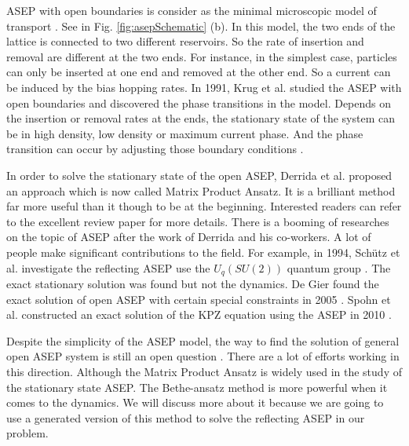 ASEP with open boundaries is consider as the minimal microscopic model of transport \cite{Crampe2014b, Mallick2011b}. See in Fig. \ref{fig:asepSchematic} (b). In this model, the two ends of the lattice is connected to two different reservoirs. So the rate of insertion and removal are different at the two ends. For instance, in the simplest case, particles can only be inserted at one end and removed at the other end. So a current can be induced by the bias hopping rates. In 1991, Krug et al. studied the ASEP with open boundaries and discovered the phase transitions in the model. Depends on the insertion or removal rates at the ends, the stationary state of the system can be in high density, low density or maximum current phase. And the phase transition can occur by adjusting those boundary conditions \cite{Krug1991}. 

In order to solve the stationary state of the open ASEP, Derrida et al. proposed an approach which is now called Matrix Product Ansatz. It is a brilliant method far more useful than it though to be at the beginning. Interested readers can refer to the excellent review paper for more details. There is a booming of researches on the topic of ASEP after the work of Derrida and his co-workers. A lot of people make significant contributions to the field. For example, in 1994, Sch\"{u}tz et al. investigate the reflecting ASEP use the $U_q(SU(2))$ quantum group \cite{Sandow1994}. The exact stationary solution was found but not the dynamics. De Gier found the exact solution of open ASEP with certain special constraints in 2005 \cite{DeGier2005}. Spohn et al. constructed an exact solution of the KPZ equation using the ASEP in 2010 \cite{Sasamoto2010}. 

Despite the simplicity of the ASEP model, the way to find the solution of general open ASEP system is still an open question \cite{Crampe2014b, Mallick2011b}. There are a lot of efforts working in this direction. Although the Matrix Product Ansatz is widely used in the study of the stationary state ASEP. The Bethe-ansatz method is more powerful when it comes to the dynamics. We will discuss more about it because we are going to use a generated version of this method to solve the reflecting ASEP in our problem. 

